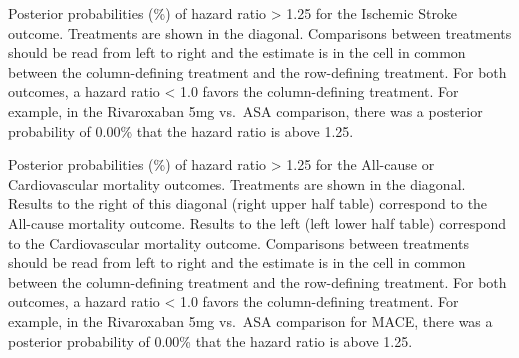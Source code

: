 \documentclass[
  12pt,
]{article}
\begin{document}
Posterior probabilities (\%) of hazard ratio \textgreater{} 1.25 for the
Ischemic Stroke outcome. Treatments are shown in the diagonal.
Comparisons between treatments should be read from left to right and the
estimate is in the cell in common between the column-defining treatment
and the row-defining treatment. For both outcomes, a hazard ratio
\textless{} 1.0 favors the column-defining treatment. For example, in
the Rivaroxaban 5mg vs.~ASA comparison, there was a posterior
probability of 0.00\% that the hazard ratio is above 1.25.

\begin{table}[!h]

\caption{\label{tab:unnamed-chunk-46}All-cause and Cardiovascular Mortality}
\centering
{}
\end{table}

Posterior probabilities (\%) of hazard ratio \textgreater{} 1.25 for the
All-cause or Cardiovascular mortality outcomes. Treatments are shown in
the diagonal. Results to the right of this diagonal (right upper half
table) correspond to the All-cause mortality outcome. Results to the
left (left lower half table) correspond to the Cardiovascular mortality
outcome. Comparisons between treatments should be read from left to
right and the estimate is in the cell in common between the
column-defining treatment and the row-defining treatment. For both
outcomes, a hazard ratio \textless{} 1.0 favors the column-defining
treatment. For example, in the Rivaroxaban 5mg vs.~ASA comparison for
MACE, there was a posterior probability of 0.00\% that the hazard ratio
is above 1.25.

\newpage
\end{document}
